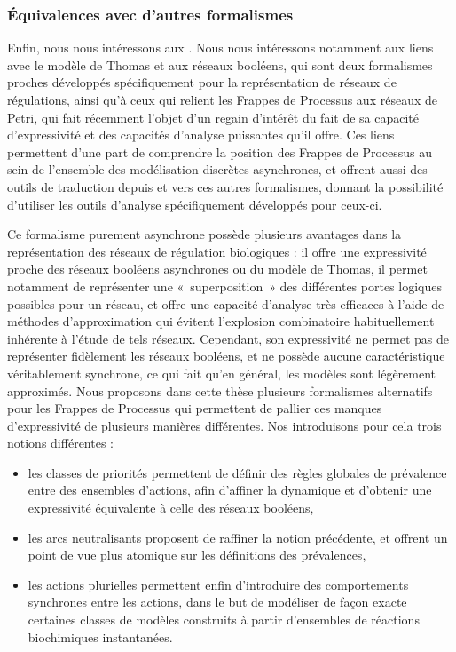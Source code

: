 \subsubsection{Équivalences avec d'autres formalismes}

Enfin, nous nous intéressons aux .
Nous nous intéressons notamment aux liens avec le modèle de Thomas et aux réseaux booléens,
qui sont deux formalismes proches
développés spécifiquement pour la représentation de réseaux de régulations,
ainsi qu'à ceux qui relient les Frappes de Processus aux réseaux de Petri,
qui fait récemment l'objet d'un regain d'intérêt du fait de sa capacité
d'expressivité et des capacités d'analyse puissantes qu'il offre.
Ces liens permettent d'une part de comprendre la position des Frappes de Processus au sein
de l'ensemble des modélisation discrètes asynchrones,
et offrent aussi des outils de traduction depuis et vers ces autres formalismes,
donnant la possibilité d'utiliser les outils d'analyse spécifiquement développés pour ceux-ci.








Ce formalisme purement asynchrone possède plusieurs avantages dans la
représentation des réseaux de régulation biologiques :
il offre une expressivité proche des réseaux booléens asynchrones ou du modèle de Thomas,
il permet notamment de représenter une «~superposition~» des différentes portes logiques possibles
pour un réseau,
et offre une capacité d'analyse très efficaces à l'aide de méthodes d'approximation
qui évitent l'explosion combinatoire habituellement inhérente à l'étude de tels réseaux.
Cependant, son expressivité ne permet pas de représenter fidèlement les réseaux booléens,
et ne possède aucune caractéristique véritablement synchrone,
ce qui fait qu'en général, les modèles sont légèrement approximés.
Nous proposons dans cette thèse plusieurs formalismes alternatifs pour les Frappes de Processus
qui permettent de pallier ces manques d'expressivité de plusieurs manières différentes.
Nos introduisons pour cela trois notions différentes :
\begin{itemize}
  \item les classes de priorités permettent de définir des règles globales de prévalence
    entre des ensembles d'actions, afin d'affiner la dynamique et d'obtenir une expressivité
    équivalente à celle des réseaux booléens,
  \item les arcs neutralisants proposent de raffiner la notion précédente,
    et offrent un point de vue plus atomique sur les définitions des prévalences,
   \item les actions plurielles permettent enfin d'introduire des comportements synchrones
    entre les actions, dans le but de modéliser de façon exacte certaines classes
    de modèles construits à partir d'ensembles de réactions biochimiques instantanées.
\end{itemize}

